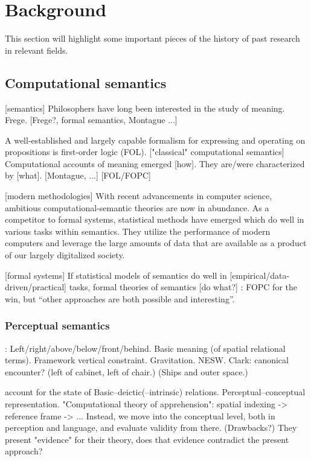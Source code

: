\glsresetall
\section{Background}
\label{sec:background}

This section will highlight some important pieces of the history of past research in relevant fields.

\subsection{Computational semantics}

[semantics]
Philosophers have long been interested in the study of meaning.
Frege.
[Frege?, formal semantics, Montague ...]

A well-established and largely capable formalism for expressing and operating on propositions is first-order logic (FOL).
["classical" computational semantics]
Computational accounts of meaning emerged [how].
They are/were characterized by [what].
[Montague, ...]
[FOL/FOPC]
\citep{BlackburnComputationalsemantics2003}


[modern methodologies]
With recent advancements in computer science, ambitious computational-semantic theories are now in abundance.
As a competitor to formal systems, statistical methods have emerged which do well in various tasks within semantics.
They utilize the performance of modern computers and leverage the large amounts of data that are available as a product of our largely digitalized society.


[formal systems]
If statistical models of semantics do well in [empirical/data-driven/practical] tasks, formal theories of semantics [do what?]
\cite{BlackburnComputationalsemantics2003}:
FOPC for the win, but ``other approaches are both possible and interesting''.





\subsubsection{Perceptual semantics}

\cite{Garnhamunifiedtheorymeaning1989}:
Left/right/above/below/front/behind.
Basic meaning (of spatial relational terms).
Framework vertical constraint.
Gravitation. NESW.
Clark: canonical encounter? (left of cabinet, left of chair.)
(Ships and outer space.)

\cite{LoganComputationalAnalysisApprehension1996} account for the state of 
Basic–deictic(–intrinsic) relations.
Perceptual–conceptual representation.
"Computational theory of apprehension": spatial indexing -> reference frame -> ... Instead, we move into the conceptual level, both in perception and language, and evaluate validity from there.
(Drawbacks?)
They present "evidence" for their theory, does that evidence contradict the present approach?

